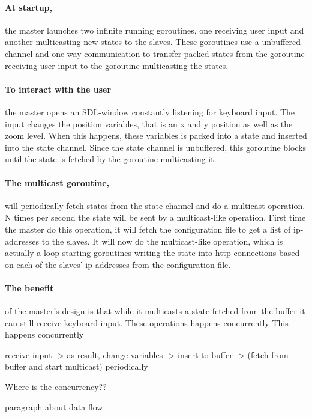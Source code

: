 \documentclass[12pt, a4paper, oneside]{article}
\begin{document}
\paragraph{At startup,}
the master launches two infinite running goroutines, one receiving user input and another multicasting new states to the slaves. These goroutines use a unbuffered channel and one way communication to transfer packed states from the goroutine receiving user input to the goroutine multicasting the states.

\paragraph{To interact with the user}
the master opens an SDL-window constantly listening for keyboard input. The input changes the position variables, that is an x and y position as well as the zoom level. When this happens, these variables is packed into a state and inserted into the state channel. Since the state channel is unbuffered, this goroutine blocks until the state is fetched by the goroutine multicasting it.

\paragraph{The multicast goroutine,}
will periodically fetch states from the state channel and do a multicast operation. N times per second the state will be sent by a multicast-like operation. First time the master do this operation, it will fetch the configuration file to get a list of ip-addresses to the slaves. It will now do the multicast-like operation, which is actually a loop starting goroutines writing the state into http connections based on each of the slaves' ip addresses from the configuration file. 


\paragraph{The benefit}
of the master's design is that while it multicasts a state fetched from the buffer it can still receive keyboard input. These operations happens concurrently   
This happens concurrently

receive input -> as result, change variables -> insert to buffer -> (fetch from buffer and start multicast) periodically

Where is the concurrency??

paragraph about data flow
\end{document}
